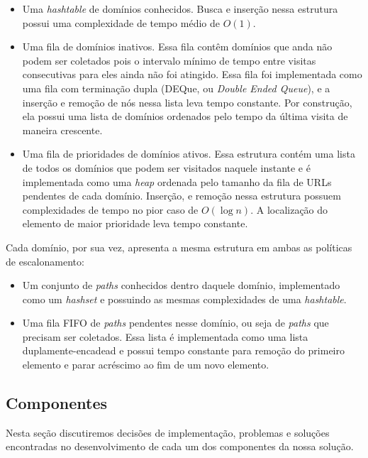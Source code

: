 \documentclass[10pt,twocolumn]{article}
\begin{document}
\begin{itemize}

\item Uma \emph{hashtable} de domínios conhecidos. Busca e inserção
nessa estrutura possui uma complexidade de tempo médio de \(O\left(1 
\right)\).

\item Uma fila de domínios inativos. Essa fila contêm domínios que
anda não podem ser coletados pois o intervalo mínimo de tempo entre
visitas consecutivas para eles ainda não foi atingido. Essa fila foi
implementada como uma fila com terminação dupla (DEQue, ou \emph{Double
Ended Queue}), e a inserção e remoção de nós nessa lista leva tempo
constante. Por construção, ela possui uma lista de domínios ordenados
pelo tempo da última visita de maneira crescente.

\item Uma fila de prioridades de domínios ativos. Essa estrutura contém
uma lista de todos os domínios que podem ser visitados naquele instante
e é implementada como uma \emph{heap} ordenada pelo tamanho da fila de
URLs pendentes de cada domínio. Inserção, e remoção nessa estrutura
possuem complexidades de tempo no pior caso de \(O\left(\log n\right)\).
A localização do elemento de maior prioridade leva tempo constante.

\end{itemize}


Cada domínio, por sua vez, apresenta a mesma estrutura em ambas as
políticas de escalonamento:
\begin{itemize}
\item Um conjunto de \emph{paths} conhecidos dentro daquele domínio,
implementado como um \emph{hashset} e possuindo as mesmas complexidades
de uma \emph{hashtable}.
\item Uma fila FIFO de \emph{paths} pendentes nesse domínio, ou seja de
\emph{paths} que precisam ser coletados. Essa lista é implementada como
uma lista duplamente-encadead e possui tempo constante para remoção do
primeiro elemento e parar acréscimo ao fim de um novo elemento.
\end{itemize}


\subsection{Componentes}

Nesta seção discutiremos decisões de implementação, problemas e soluções
encontradas no desenvolvimento de cada um dos componentes da nossa
solução.
\end{document}
